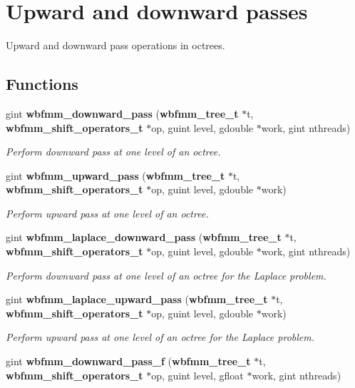\section{Upward and downward passes}
\label{group__pass}


Upward and downward pass operations in octrees.  


\subsection*{Functions}
\begin{DoxyCompactItemize}
\item 
gint {\bf wbfmm\+\_\+downward\+\_\+pass} ({\bf wbfmm\+\_\+tree\+\_\+t} $\ast$t, {\bf wbfmm\+\_\+shift\+\_\+operators\+\_\+t} $\ast$op, guint level, gdouble $\ast$work, gint nthreads)
\begin{DoxyCompactList}\small\item\em Perform downward pass at one level of an octree. \end{DoxyCompactList}\item 
gint {\bf wbfmm\+\_\+upward\+\_\+pass} ({\bf wbfmm\+\_\+tree\+\_\+t} $\ast$t, {\bf wbfmm\+\_\+shift\+\_\+operators\+\_\+t} $\ast$op, guint level, gdouble $\ast$work)
\begin{DoxyCompactList}\small\item\em Perform upward pass at one level of an octree. \end{DoxyCompactList}\item 
gint {\bf wbfmm\+\_\+laplace\+\_\+downward\+\_\+pass} ({\bf wbfmm\+\_\+tree\+\_\+t} $\ast$t, {\bf wbfmm\+\_\+shift\+\_\+operators\+\_\+t} $\ast$op, guint level, gdouble $\ast$work, gint nthreads)
\begin{DoxyCompactList}\small\item\em Perform downward pass at one level of an octree for the Laplace problem. \end{DoxyCompactList}\item 
gint {\bf wbfmm\+\_\+laplace\+\_\+upward\+\_\+pass} ({\bf wbfmm\+\_\+tree\+\_\+t} $\ast$t, {\bf wbfmm\+\_\+shift\+\_\+operators\+\_\+t} $\ast$op, guint level, gdouble $\ast$work)
\begin{DoxyCompactList}\small\item\em Perform upward pass at one level of an octree for the Laplace problem. \end{DoxyCompactList}\item 
gint {\bf wbfmm\+\_\+downward\+\_\+pass\+\_\+f} ({\bf wbfmm\+\_\+tree\+\_\+t} $\ast$t, {\bf wbfmm\+\_\+shift\+\_\+operators\+\_\+t} $\ast$op, guint level, gfloat $\ast$work, gint nthreads)

\end{DoxyCompactItemize}
